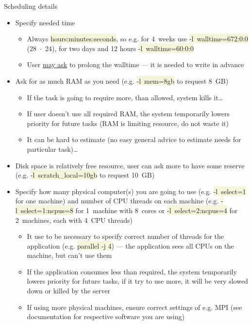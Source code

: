 \documentclass[compress, ucs, xelatex, 11pt, xcolor=svgnames, aspectratio=169,
	hyperref={
		bookmarks=true,
		unicode=true,
		colorlinks=true,
		pdftitle={Linux, command line and MetaCentrum},
		plainpages=false,
		pdfauthor={Vojtech Zeisek},
		pdfsubject={Course about use of Linux command line, writing shell scripts and using MetaCentrum of CESNET},
		pdfcreator={XeLaTeX},
		pdfkeywords={Linux, GNU, BASH, shell, command line, MetaCentrum},
		linkcolor=DarkRed, %
		anchorcolor=DarkBlue, %
		citecolor=Indigo, %
		filecolor=NavyBlue, %
		menucolor=DarkMagenta, %
		urlcolor=DarkBlue, %
		pdftex},
	url={hyphens, lowtilde} %
	]{beamer}
\renewcommand{\texttt}[1]{\colorbox{Beige}{{\ttfamily #1}}}
\begin{document}
\begin{frame}[allowframebreaks]{Scheduling details}
	\begin{itemize}
		\item Specify needed time
		\begin{itemize}
			\item Always \texttt{hours:minutes:seconds}, so e.g. for 4~weeks use \texttt{-l~walltime=672:0:0} (28~$\cdot$~24), for two days and 12 hours \texttt{-l~walltime=60:0:0}
			\item User \href{mailto:meta@cesnet.cz}{may ask} to prolong the walltime --- it is needed to write in advance
		\end{itemize}
		\item Ask for as much RAM as you need (e.g. \texttt{-l~mem=8gb} to request 8~GB)
		\begin{itemize}
			\item If the task is going to require more, than allowed, system kills it\ldots
			\item If user doesn't use all required RAM, the system temporarily lowers priority for future tasks (RAM is limiting resource, do not waste it)
			\item It can be hard to estimate (no easy general advice to estimate needs for particular task)\ldots
		\end{itemize}
		\item Disk space is relatively free resource, user can ask more to have some reserve (e.g. \texttt{-l~scratch\_local=10gb} to request 10~GB)
		\item Specify how many physical computer(s) you are going to use (e.g. \texttt{-l~select=1} for one machine) and number of CPU threads on each machine (e.g. \texttt{-l~select=1:ncpus=8} for 1~machine with 8~cores or \texttt{-l~select=2:ncpus=4} for 2~machines, each with 4~CPU threads)
		\begin{itemize}
			\item It use to be necessary to specify correct number of threads for the application (e.g. \texttt{parallel -j 4}) --- the application sees all CPUs on the machine, but can't use them
			\item If the application consumes less than required, the system temporarily lowers priority for future tasks, if it try to use more, it will be very slowed down or killed by the server
			\item If using more physical machines, ensure correct settings of e.g. MPI (see documentation for respective software you are using)
		\end{itemize}

\end{itemize}
\end{frame}
\end{document}

